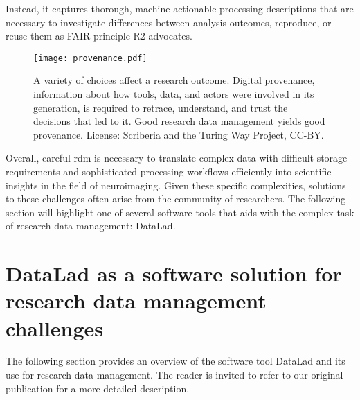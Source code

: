 Instead, it captures thorough, machine-actionable processing descriptions that are necessary to investigate differences between analysis outcomes, reproduce, or reuse them as \gls{FAIR} principle R2 advocates.
\begin{figure}[H]
	\centering
	\texttt{[image: provenance.pdf]}
	\caption[Provenance throughout the research process]{A variety of choices affect a research outcome. Digital provenance, information about how tools, data, and actors were involved in its generation, is required to retrace, understand, and trust the decisions that led to it. Good research data management yields good provenance. License: Scriberia and the Turing Way Project, CC-BY.}
	\label{fig:prov1}
\end{figure}



Overall, careful \gls{rdm} is necessary to translate complex data with difficult storage requirements and sophisticated processing workflows efficiently into scientific insights in the field of neuroimaging.
Given these specific complexities, solutions to these challenges often arise from the community of researchers.
The following section will highlight one of several software tools that aids with the complex task of research data management: DataLad.






\section{DataLad as a software solution for research data management challenges}

	The following section provides an overview of the software tool DataLad and its use for research data management.
	The reader is invited to refer to our original publication \citep{Halchenko2021} for a more detailed description.%

